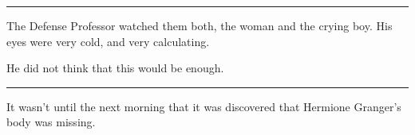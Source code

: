 \begin{center}\rule{3in}{0.4pt}\end{center}

The Defense Professor watched them both, the woman and the crying boy. His eyes were very cold, and very calculating.

He did not think that this would be enough.

\begin{center}\rule{3in}{0.4pt}\end{center}

It wasn't until the next morning that it was discovered that Hermione Granger's body was missing.
